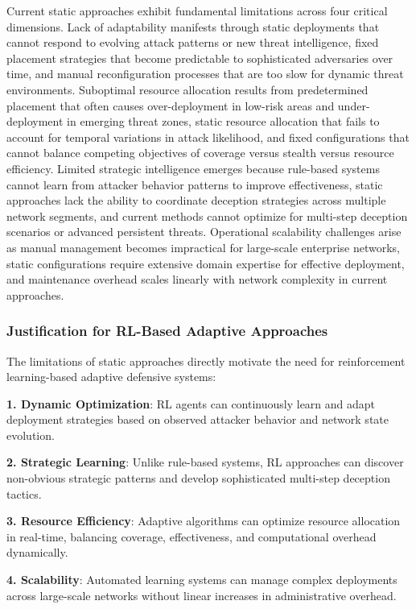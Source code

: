 \documentclass[12pt,oneside]{article}
\begin{document}
Current static approaches exhibit fundamental limitations across four critical dimensions. Lack of adaptability manifests through static deployments that cannot respond to evolving attack patterns or new threat intelligence, fixed placement strategies that become predictable to sophisticated adversaries over time, and manual reconfiguration processes that are too slow for dynamic threat environments. Suboptimal resource allocation results from predetermined placement that often causes over-deployment in low-risk areas and under-deployment in emerging threat zones, static resource allocation that fails to account for temporal variations in attack likelihood, and fixed configurations that cannot balance competing objectives of coverage versus stealth versus resource efficiency. Limited strategic intelligence emerges because rule-based systems cannot learn from attacker behavior patterns to improve effectiveness, static approaches lack the ability to coordinate deception strategies across multiple network segments, and current methods cannot optimize for multi-step deception scenarios or advanced persistent threats. Operational scalability challenges arise as manual management becomes impractical for large-scale enterprise networks, static configurations require extensive domain expertise for effective deployment, and maintenance overhead scales linearly with network complexity in current approaches.

\subsubsection{Justification for RL-Based Adaptive Approaches}

The limitations of static approaches directly motivate the need for reinforcement learning-based adaptive defensive systems:

\textbf{1. Dynamic Optimization}: RL agents can continuously learn and adapt deployment strategies based on observed attacker behavior and network state evolution.

\textbf{2. Strategic Learning}: Unlike rule-based systems, RL approaches can discover non-obvious strategic patterns and develop sophisticated multi-step deception tactics.

\textbf{3. Resource Efficiency}: Adaptive algorithms can optimize resource allocation in real-time, balancing coverage, effectiveness, and computational overhead dynamically.

\textbf{4. Scalability}: Automated learning systems can manage complex deployments across large-scale networks without linear increases in administrative overhead.
\end{document}

